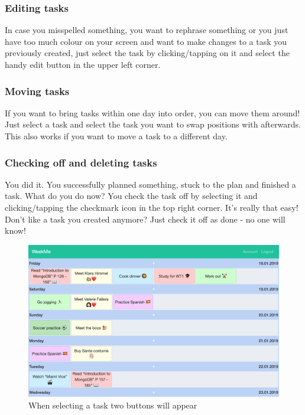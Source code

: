\subsubsection{Editing tasks}
In case you misspelled something, you want to rephrase something or you just have too much colour on your screen and want to make changes to a task you previously created, just select the task by clicking/tapping on it and select the handy edit button in the upper left corner. 
\subsubsection{Moving tasks}
If you want to bring tasks within one day into order, you can move them around! Just select a task and select the task you want to swap positions with afterwards. 
This also works if you want to move a task to a different day. 
\subsubsection{Checking off and deleting tasks}
You did it. You successfully planned something, stuck to the plan and finished a task. What do you do now? You check the task off by selecting it and clicking/tapping the checkmark icon in the top right corner. It's really that easy! \\
Don't like a task you created anymore? Just check it off as done - no one will know!

\begin{figure}[H] 
	\centering 
	\includegraphics[width=14cm]{figures/user_docu_selected_task_desktop.png}   
	\caption[WeekMe account page]{When selecting a task two buttons will appear}       
	\label{fig: Selected task on desktop}     
\end{figure}  

